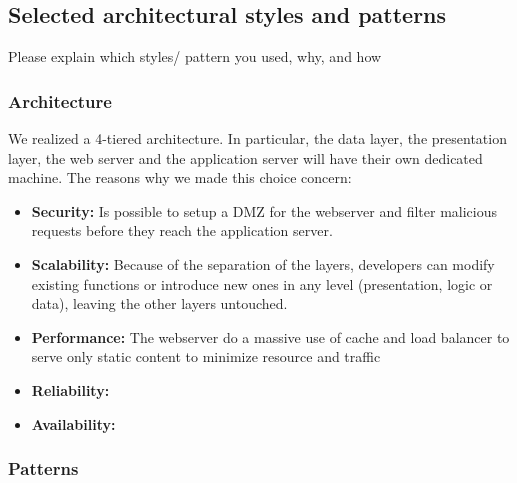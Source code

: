 \newpage

\subsection{Selected architectural styles and patterns}
Please explain which styles/ pattern you used, why, and how
\subsubsection{Architecture}

We realized a 4-tiered architecture. In particular, the data layer, the presentation layer, the web server and the application server will have their own dedicated machine. The reasons why we made this choice concern:

\begin{itemize}
\item {\textbf{Security:}} Is possible to setup a DMZ for the webserver and filter malicious requests before they reach the application server.
\item {\textbf{Scalability:}} Because of the separation of the layers, developers can modify existing functions or introduce new ones in any level (presentation, logic or data), leaving the other layers untouched.
\item {\textbf{Performance:} The webserver do a massive use of cache and load balancer to serve only static content to minimize resource and traffic}
\item {\textbf{Reliability:}} 
\item {\textbf{Availability:}}
\end{itemize}


\subsubsection{Patterns}


